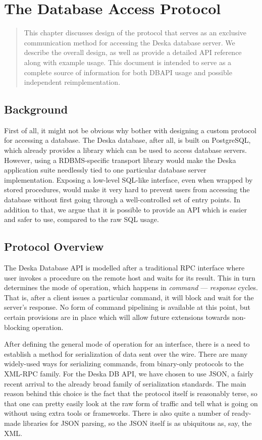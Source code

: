 \documentclass[deska]{subfiles}
\begin{document}
\chapter{The Database Access Protocol}

\begin{abstract}
This chapter discusses design of the protocol that serves as an exclusive communication method for accessing the Deska
database server.  We describe the overall design, as well as provide a detailed API reference along with example usage.
This document is intended to serve as a complete source of information for both DBAPI usage and possible independent
reimplementation.
\end{abstract}

\section{Background}
\label{sec:dbapi-protocol}

First of all, it might not be obvious why bother with designing a custom protocol for accessing a database.  The Deska
database, after all, is built on PostgreSQL, which already provides a library which can be used to access database
servers.  However, using a RDBMS-specific transport library would make the Deska application suite needlessly tied to
one particular database server implementation.  Exposing a low-level SQL-like interface, even when wrapped by stored
procedures, would make it very hard to prevent users from accessing the database without first going through a
well-controlled set of entry points.  In addition to that, we argue that it is possible to provide an API which is
easier and safer to use, compared to the raw SQL usage.

\section{Protocol Overview}

The Deska Database API is modelled after a traditional RPC interface where user invokes a procedure on the remote host
and waits for its result.  This in turn determines the mode of operation, which happens in {\em command} --- {\em
response} cycles.  That is, after a client issues a particular command, it will block and wait for the server's
response.  No form of command pipelining is available at this point, but certain provisions are in place which will
allow future extensions towards non-blocking operation.

After defining the general mode of operation for an interface, there is a need to establish a method for serialization
of data sent over the wire.  There are many widely-used ways for serializing commands, from binary-only protocols to the
XML-RPC family.  For the Deska DB API, we have chosen to use JSON, a fairly recent arrival to the already broad family
of serialization standards.  The main reason behind this choice is the fact that the protocol itself is reasonably
terse, so that one can pretty easily look at the raw form of traffic and tell what is going on without using extra tools
or frameworks.  There is also quite a number of ready-made libraries for JSON parsing, so the JSON itself is as
ubiquitous as, say, the XML.
\end{document}
